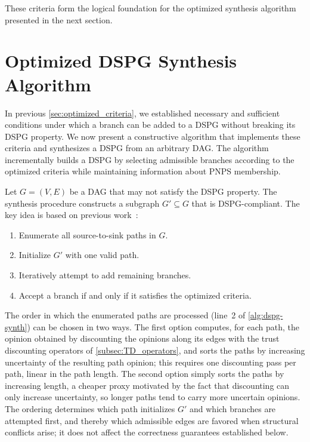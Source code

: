 These criteria form the logical foundation for the optimized synthesis algorithm presented in the next section.


\section{Optimized \acs{DSPG} Synthesis Algorithm}
\label{sec:optimized_algorithm}

In previous \cref{sec:optimized_criteria}, we established necessary and sufficient conditions under which a branch can be added to a \ac{DSPG} without breaking its \ac{DSPG} property. We now present a constructive algorithm that implements these criteria and synthesizes a \ac{DSPG} from an arbitrary \ac{DAG}. The algorithm incrementally builds a \ac{DSPG} by selecting admissible branches according to the optimized criteria while maintaining information about \ac{PNPS} membership.


Let $G = (V,E)$ be a \ac{DAG} that may not satisfy the \ac{DSPG} property. The synthesis procedure constructs a subgraph $G' \subseteq G$ that is \ac{DSPG}-compliant. The key idea is based on previous work~\cite{4622580}:
\begin{enumerate}
    \item Enumerate all source-to-sink paths in $G$.
    \item Initialize $G'$ with one valid path.
    \item Iteratively attempt to add remaining branches.
    \item Accept a branch if and only if it satisfies the optimized criteria.
\end{enumerate}

The order in which the enumerated paths are processed (line~2 of \cref{alg:dspg-synth}) can be chosen in two ways. The first option computes, for each path, the opinion obtained by discounting the opinions along its edges with the trust discounting operators of \cref{subsec:TD_operators}, and sorts the paths by increasing uncertainty of the resulting path opinion; this requires one discounting pass per path, linear in the path length. The second option simply sorts the paths by increasing length, a cheaper proxy motivated by the fact that discounting can only increase uncertainty, so longer paths tend to carry more uncertain opinions. The ordering determines which path initializes $G'$ and which branches are attempted first, and thereby which admissible edges are favored when structural conflicts arise; it does not affect the correctness guarantees established below.

